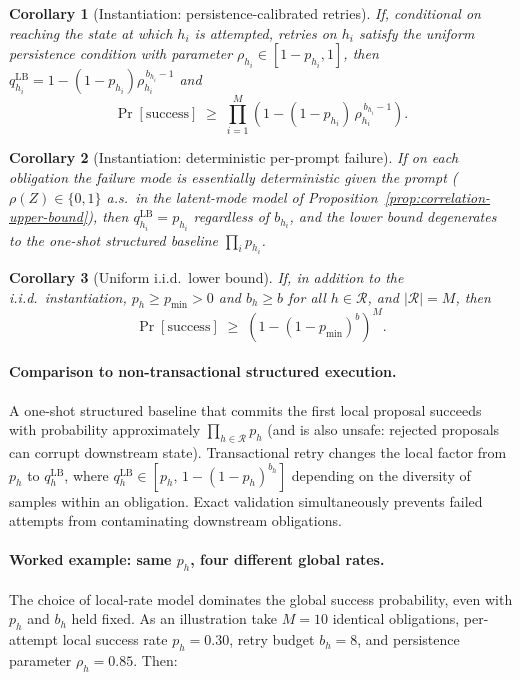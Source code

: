 \documentclass[11pt]{article}
\newtheorem{corollary}{Corollary}
\begin{document}
\begin{corollary}[Instantiation: persistence-calibrated retries]
\label{cor:product-persistence}
If, conditional on reaching the state at which $h_i$ is attempted, retries on
$h_i$ satisfy the uniform persistence condition with parameter
$\rho_{h_i}\in[1-p_{h_i},1]$, then
$q_{h_i}^{\mathrm{LB}} = 1 - (1-p_{h_i})\rho_{h_i}^{\,b_{h_i}-1}$ and
\[
\Pr[\mathrm{success}]
\;\ge\;
\prod_{i=1}^{M}\left(1-(1-p_{h_i})\,\rho_{h_i}^{\,b_{h_i}-1}\right).
\]
\end{corollary}

\begin{corollary}[Instantiation: deterministic per-prompt failure]
\label{cor:product-deterministic}
If on each obligation the failure mode is essentially deterministic given the
prompt ($\rho(Z)\in\{0,1\}$ a.s.\ in the latent-mode model of
Proposition~\ref{prop:correlation-upper-bound}), then
$q_{h_i}^{\mathrm{LB}} = p_{h_i}$ regardless of $b_{h_i}$, and the lower
bound degenerates to the one-shot structured baseline
$\prod_i p_{h_i}$.
\end{corollary}

\begin{corollary}[Uniform i.i.d.\ lower bound]
If, in addition to the i.i.d.\ instantiation, $p_h \ge p_{\min}>0$ and
$b_h\ge b$ for all $h\in\mathcal{R}$, and $|\mathcal{R}|=M$, then
\[
\Pr[\mathrm{success}]
\;\ge\;
\left(1-(1-p_{\min})^b\right)^M.
\]
\end{corollary}

\paragraph{Comparison to non-transactional structured execution.}
A one-shot structured baseline that commits the first local proposal succeeds
with probability approximately $\prod_{h\in\mathcal{R}} p_h$ (and is also
unsafe: rejected proposals can corrupt downstream state). Transactional retry
changes the local factor from $p_h$ to $q_h^{\mathrm{LB}}$, where
$q_h^{\mathrm{LB}}\in[p_h,\, 1-(1-p_h)^{b_h}]$ depending on the diversity of
samples within an obligation. Exact validation simultaneously prevents
failed attempts from contaminating downstream obligations.

\paragraph{Worked example: same $p_h$, four different global rates.}
The choice of local-rate model dominates the global success probability,
even with $p_h$ and $b_h$ held fixed. As an illustration take $M=10$
identical obligations, per-attempt local success rate $p_h=0.30$, retry
budget $b_h=8$, and persistence parameter $\rho_h=0.85$. Then:
\end{document}
